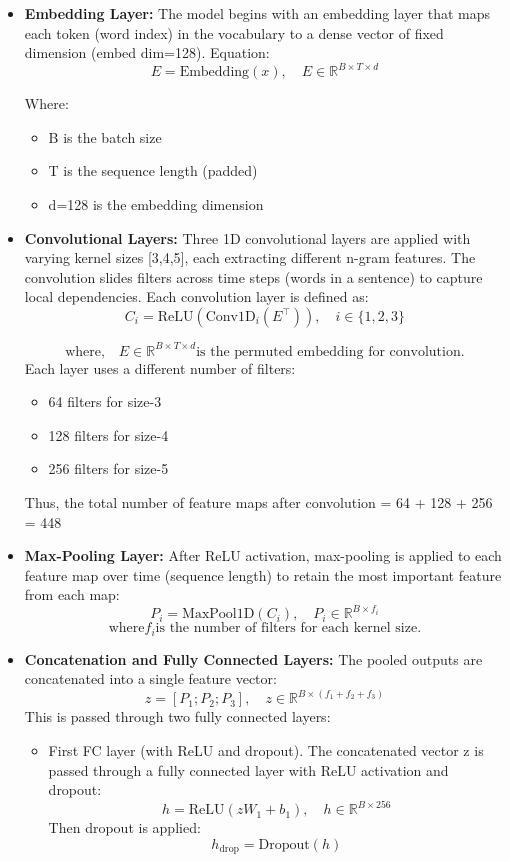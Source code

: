 \documentclass{article}
\begin{document}
\begin{itemize}
\item \textbf{Embedding Layer:} The model begins with an embedding layer that maps each token (word index) in the vocabulary to a dense vector of fixed dimension (embed dim=128). Equation:
\[
E = \text{Embedding}(x), \quad E \in \mathbb{R}^{B \times T \times d}
\]

Where:
\begin{itemize}
\item B is the batch size
\item T is the sequence length (padded)
\item d=128 is the embedding dimension
\end{itemize}

\item \textbf{Convolutional Layers:} Three 1D convolutional layers are applied with varying kernel sizes [3,4,5], each extracting different n-gram features. The convolution slides filters across time steps (words in a sentence) to capture local dependencies. Each convolution layer is defined as:
\[
C_i = \text{ReLU}(\text{Conv1D}_i(E^\top)), \quad i \in \{1, 2, 3\}
\]

\[\text{where,} \quad E \in \mathbb{R}^{B \times T \times d}  \text{is the permuted embedding for convolution.}\]
Each layer uses a different number of filters:
\begin{itemize}
\item 64 filters for size-3
\item 128 filters for size-4
\item 256 filters for size-5
\end{itemize}
Thus, the total number of feature maps after convolution = 64 + 128 + 256 = 448

\item \textbf{Max-Pooling Layer:} After ReLU activation, max-pooling is applied to each feature map over time (sequence length) to retain the most important feature from each map:
\[
P_i = \text{MaxPool1D}(C_i), \quad P_i \in \mathbb{R}^{B \times f_i}
\]
\[\text{where}  {f_i} \text{is the number of filters for each kernel size.}\] 

\item \textbf{Concatenation and Fully Connected Layers:} The pooled outputs are concatenated into a single feature vector:
\[
z = [P_1; P_2; P_3], \quad z \in \mathbb{R}^{B \times (f_1 + f_2 + f_3)}
\]
This is passed through two fully connected layers:
\begin{itemize}
\item First FC layer (with ReLU and dropout).
The concatenated vector z is passed through a fully connected layer with ReLU activation and dropout:
\[
h = \text{ReLU}(zW_1 + b_1), \quad h \in \mathbb{R}^{B \times 256}
\]
Then dropout is applied:
\[
h_{\text{drop}} = \text{Dropout}(h)
\]


\end{itemize}
\end{itemize}
\end{document}
